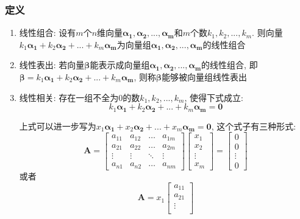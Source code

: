 \subsubsection{定义}
\begin{enumerate}
\item 线性组合: 设有$ m $个$ n $维向量$ \bm{\alpha_{1}},\bm{\alpha_{2}},...,\bm{\alpha_{m}} $和$ m $个数$ k_{1},k_{2},...,k_{m} $. 则向量$ k_{1}\bm{\alpha_{1}}+k_{2}\bm{\alpha_{2}}+...+k_{m}\bm{\alpha_{m}} $为向量组$ \bm{\alpha_{1}},\bm{\alpha_{2}},...,\bm{\alpha_{m}} $的线性组合
\item 线性表出: 若向量$ \bm{\beta} $能表示成向量组$ \bm{\alpha_{1}},\bm{\alpha_{2}},...,\bm{\alpha_{m}} $的线性组合, 即$ \bm{\beta}=k_{1}\bm{\alpha_{1}}+k_{2}\bm{\alpha_{2}}+...+k_{m}\bm{\alpha_{m}} $, 则称$ \bm{\beta} $能够被向量组线性表出
\item 线性相关: 存在一组不全为$ 0 $的数$ k_{1},k_{2},...,k_{m} $, 使得下式成立:
\begin{equation*}
k_{1}\bm{\alpha_{1}}+k_{2}\bm{\alpha_{2}}+...+k_{m}\bm{\alpha_{m}}=\bm{0}
\end{equation*}\par
上式可以进一步写为$ x_{1}\bm{\alpha_{1}}+x_{2}\bm{\alpha_{2}}+...+x_{m}\bm{\alpha_{m}}=\bm{0} $, 这个式子有三种形式:
\begin{equation*}
\bm{A}=\begin{bmatrix}
a_{11} & a_{12} & \dots & a_{1m} \\
a_{21} & a_{22} & \dots & a_{2m} \\
\vdots & \vdots & \ddots & \vdots \\
a_{n1} & a_{n2} & \dots & a_{nm}
\end{bmatrix}
\begin{bmatrix}
x_{1} \\
x_{2} \\
\vdots \\
x_{m}
\end{bmatrix}=
\begin{bmatrix}
0 \\
0 \\
\vdots \\
0
\end{bmatrix}
\end{equation*}
或者
\begin{equation*}
\bm{A}=x_{1}\begin{bmatrix}
a_{11} \\
a_{21} \\
\vdots \\

\end{bmatrix}
\end{equation*}
\end{enumerate}
